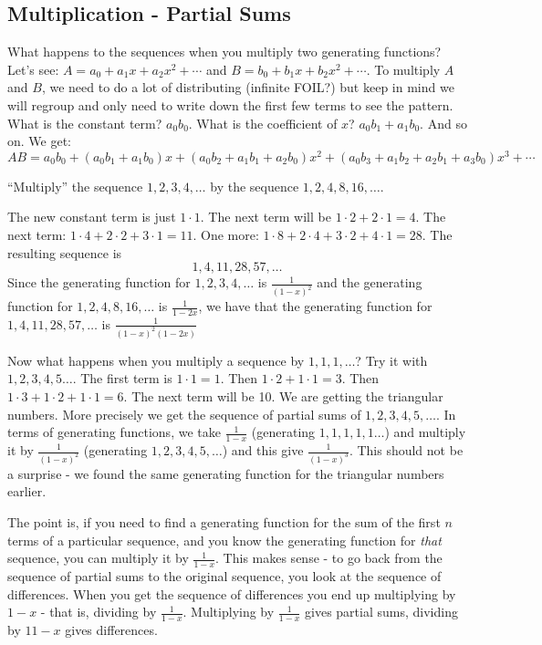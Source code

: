 \documentclass[12pt]{article}
\begin{document}
  

  \subsection{Multiplication - Partial Sums}

What happens to the sequences when you multiply two generating functions?  Let's see: $A = a_0 + a_1x + a_2x^2 + \cdots$ and $B = b_0 + b_1x + b_2x^2 + \cdots$.  To multiply $A$ and $B$, we need to do a lot of distributing (infinite FOIL?) but keep in mind we will regroup and only need to write down the first few terms to see the pattern.  What is the constant term?  $a_0b_0$.  What is the coefficient of $x$?  $a_0b_1 + a_1b_0$.  And so on.  We get:
 \[AB = a_0b_0 + (a_0b_1 + a_1b_0)x + (a_0b_2 + a_1b_1 + a_2b_0)x^2 + (a_0b_3 + a_1b_2 + a_2b_1 + a_3b_0)x^3 + \cdots\]
  
\begin{example}
 ``Multiply'' the sequence $1, 2, 3, 4, \ldots$ by the sequence $1, 2, 4, 8, 16, \ldots$.
 
 \begin{solution}
  The new constant term is just $1 \cdot 1$.  The next term will be $1\cdot 2 + 2 \cdot 1 = 4$.  The next term: $1 \cdot 4 + 2 \cdot 2 + 3 \cdot 1 = 11$.  One more: $1 \cdot 8 + 2 \cdot 4 + 3 \cdot 2 + 4 \cdot 1 = 28$.  The resulting sequence is
  \[1, 4, 11, 28, 57, \ldots\]
  Since the generating function for $1,2,3,4, \ldots$ is $\frac{1}{(1-x)^2}$ and the generating function for $1,2,4,8, 16, \ldots$ is $\frac{1}{1-2x}$, we have that the generating function for $1,4, 11, 28, 57, \ldots$ is $\frac{1}{(1-x)^2(1-2x)}$
 \end{solution}

\end{example}
  
Now what happens when you multiply a sequence by $1, 1, 1, \ldots$?  Try it with $1, 2, 3, 4, 5\ldots$.  The first term is $1\cdot 1 = 1$.  Then $1\cdot 2 + 1 \cdot 1 = 3$.  Then $1\cdot 3 + 1\cdot 2 + 1 \cdot 1 = 6$.  The next term will be 10.  We are getting the triangular numbers.  More precisely we get the sequence of partial sums of $1,2,3,4,5, \ldots$.  In terms of generating functions, we take $\frac{1}{1-x}$ (generating $1,1,1,1,1\ldots$) and multiply it by $\frac{1}{(1-x)^2}$ (generating $1,2,3,4,5,\ldots$) and this give $\frac{1}{(1-x)^3}$.  This should not be a surprise - we found the same generating function for the triangular numbers earlier.
  
The point is, if you need to find a generating function for the sum of the first $n$ terms of a particular sequence, and you know the generating function for {\em that} sequence, you can multiply it by $\frac{1}{1-x}$.  This makes sense - to go back from the sequence of partial sums to the original sequence, you look at the sequence of differences.  When you get the sequence of differences you end up multiplying by $1-x$ - that is, dividing by $\frac{1}{1-x}$.  Multiplying by $\frac{1}{1-x}$ gives partial sums, dividing by ${1}{1-x}$ gives differences.
  
\end{document}
